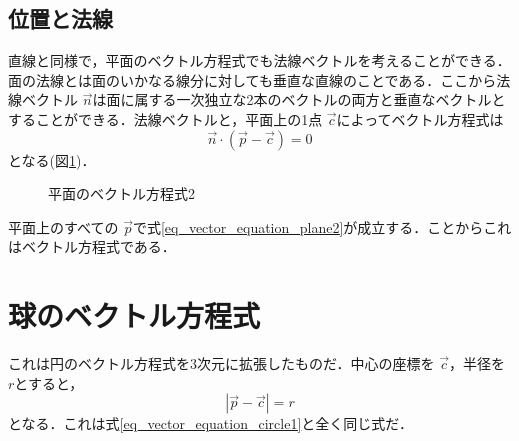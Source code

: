 \documentclass[dvipdfmx]{jsarticle}
\begin{document}
    \subsection{位置と法線}
    直線と同様で，平面のベクトル方程式でも法線ベクトルを考えることができる．面の法線とは面のいかなる線分に対しても垂直な直線のことである．ここから法線ベクトル \(\vec{n}\)は面に属する一次独立な2本のベクトルの両方と垂直なベクトルとすることができる．法線ベクトルと，平面上の1点 \(\vec{c}\)によってベクトル方程式は
    \begin{equation}
        \vec{n}\cdot (\vec{p}-\vec{c})=0
        \label{eq_vector_equation_plane2}
    \end{equation}
    となる(図\ref{tikz_vector_equation_plane2})．

    \begin{figure}[htbp]\centering
        \caption{平面のベクトル方程式2}
        \label{tikz_vector_equation_plane2}
    \end{figure}

    平面上のすべての \(\vec{p}\)で式\eqref{eq_vector_equation_plane2}が成立する．ことからこれはベクトル方程式である．

    \section{球のベクトル方程式}
    これは円のベクトル方程式を3次元に拡張したものだ．中心の座標を \(\vec{c}\)，半径を \(r\)とすると，
    \begin{equation}
        |\vec{p}-\vec{c}|=r
        \label{eq_vector_equation_ball1}
    \end{equation}
    となる．これは式\eqref{eq_vector_equation_circle1}と全く同じ式だ．
\end{document}
